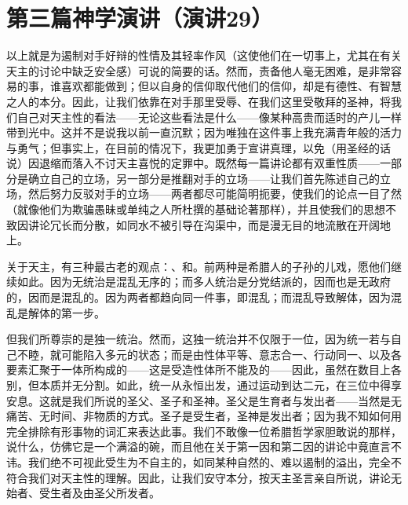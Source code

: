 

\section{第三篇神学演讲（演讲29）}

\par

\par

以上就是为遏制对手好辩的性情及其轻率作风（这使他们在一切事上，尤其在有关天主的讨论中缺乏安全感）可说的简要的话。然而，责备他人毫无困难，是非常容易的事，谁喜欢都能做到；但以自身的信仰取代他们的信仰，却是有德性、有智慧之人的本分。因此，让我们依靠在对手那里受辱、在我们这里受敬拜的圣神，将我们自己对天主性的看法——无论这些看法是什么——像某种高贵而适时的产儿一样带到光中。这并不是说我以前一直沉默；因为唯独在这件事上我充满青年般的活力与勇气；但事实上，在目前的情况下，我更加勇于宣讲真理，以免（用圣经的话说）因退缩而落入不讨天主喜悦的定罪中。既然每一篇讲论都有双重性质——一部分是确立自己的立场，另一部分是推翻对手的立场——让我们首先陈述自己的立场，然后努力反驳对手的立场——两者都尽可能简明扼要，使我们的论点一目了然（就像他们为欺骗愚昧或单纯之人所杜撰的基础论著那样），并且使我们的思想不致因讲论冗长而分散，如同水不被引导在沟渠中，而是漫无目的地流散在开阔地上。\par

关于天主，有三种最古老的观点：、和。前两种是希腊人的子孙的儿戏，愿他们继续如此。因为无统治是混乱无序的；而多人统治是分党结派的，因而也是无政府的，因而是混乱的。因为两者都趋向同一件事，即混乱；而混乱导致解体，因为混乱是解体的第一步。\par

但我们所尊崇的是独一统治。然而，这独一统治并不仅限于一位，因为统一若与自己不睦，就可能陷入多元的状态；而是由性体平等、意志合一、行动同一、以及各要素汇聚于一体所构成的——这是受造性体所不能及的——因此，虽然在数目上各别，但本质并无分割。如此，统一从永恒出发，通过运动到达二元，在三位中得享安息。这就是我们所说的圣父、圣子和圣神。圣父是生育者与发出者——当然是无痛苦、无时间、非物质的方式。圣子是受生者，圣神是发出者；因为我不知如何用完全排除有形事物的词汇来表达此事。我们不敢像一位希腊哲学家胆敢说的那样，说什么，仿佛它是一个满溢的碗，而且他在关于第一因和第二因的讲论中竟直言不讳。我们绝不可视此受生为不自主的，如同某种自然的、难以遏制的溢出，完全不符合我们对天主性的理解。因此，让我们安守本分，按天主圣言亲自所说，讲论无始者、受生者及由圣父所发者。\par

